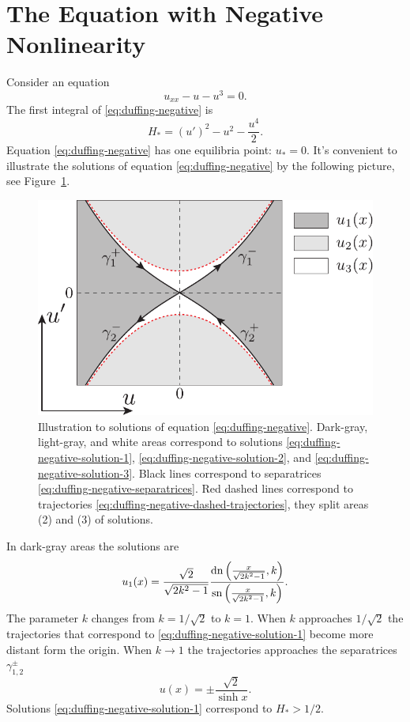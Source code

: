 \section{The Equation with Negative Nonlinearity}

Consider an equation
\begin{equation}
	u_{xx} - u - u^3 = 0.
\label{eq:duffing-negative}
\end{equation}
The first integral of \eqref{eq:duffing-negative} is
\begin{equation}
	H_* = (u')^2 - u^2 - \frac{u^4}{2}.
\end{equation}
Equation \eqref{eq:duffing-negative} has one equilibria point: $u_* = 0$.
It's convenient to illustrate the solutions of equation \eqref{eq:duffing-negative} by the following picture, see Figure~\ref{fig:duffing-negative}.
\begin{figure}[h]
\centering
	\includegraphics[scale = 1]{pic/duffing negative illustration}
	\caption{
		Illustration to solutions of equation \eqref{eq:duffing-negative}.
		Dark-gray, light-gray, and white areas correspond to solutions \eqref{eq:duffing-negative-solution-1}, \eqref{eq:duffing-negative-solution-2}, and \eqref{eq:duffing-negative-solution-3}.
		Black lines correspond to separatrices \eqref{eq:duffing-negative-separatrices}.
		Red dashed lines correspond to trajectories \eqref{eq:duffing-negative-dashed-trajectories}, they split areas (2) and (3) of solutions.
	}
\label{fig:duffing-negative}
\end{figure}

In dark-gray areas the solutions are
\begin{equation}
	u_1(x) = \frac{\sqrt{2}}{\sqrt{2k^2 - 1}} \frac{\mathop\mathrm{dn} \left( \frac{x}{\sqrt{2k^2 - 1}}, k \right)}{\mathop\mathrm{sn} \left( \frac{x}{\sqrt{2k^2 - 1}}, k \right)}.
\label{eq:duffing-negative-solution-1}
\end{equation}
The parameter $k$ changes from $k = 1 / \sqrt{2}$ to $k = 1$.
When $k$ approaches $1 / \sqrt{2}$ the trajectories that correspond to \eqref{eq:duffing-negative-solution-1} become more distant form the origin.
When $k \to 1$ the trajectories approaches the separatrices $\gamma_{1, 2}^{\pm}$
\begin{equation}
	u(x) = \pm \frac{\sqrt{2}}{\sinh x}.
\label{eq:duffing-negative-separatrices}
\end{equation}
Solutions \eqref{eq:duffing-negative-solution-1} correspond to $H_* > 1/2$.

